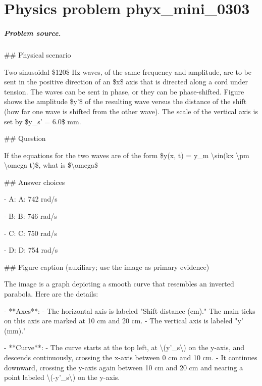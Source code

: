 
\chapter{Physics problem phyx\_mini\_0303}
\label{ch:PhyXMiniProblems_problem_phyx_mini_0303}

\paragraph{Problem source.}
\#\# Physical scenario

Two sinusoidal \$120\$ Hz waves, of the same frequency and amplitude, are to be sent in the positive direction of an \$x\$ axis that is directed along a cord under tension. The waves can be sent in phase, or they can be phase-shifted. Figure shows the amplitude \$y'\$ of the resulting wave versus the distance of the shift (how far one wave is shifted from the other wave). The scale of the vertical axis is set by \$y\_s' = 6.0\$ mm.

\#\# Question

If the equations for the two waves are of the form \$y(x, t) = y\_m \textbackslash{}sin(kx \textbackslash{}pm \textbackslash{}omega t)\$, what is \$\textbackslash{}omega\$

\#\# Answer choices

- A: A: 742 rad/s

- B: B: 746 rad/s

- C: C: 750 rad/s

- D: D: 754 rad/s

\#\# Figure caption (auxiliary; use the image as primary evidence)

The image is a graph depicting a smooth curve that resembles an inverted parabola. Here are the details:

- **Axes**:
  - The horizontal axis is labeled "Shift distance (cm)." The main ticks on this axis are marked at 10 cm and 20 cm.
  - The vertical axis is labeled "y' (mm)."

- **Curve**:
  - The curve starts at the top left, at \textbackslash{}(y'\_s\textbackslash{}) on the y-axis, and descends continuously, crossing the x-axis between 0 cm and 10 cm.
  - It continues downward, crossing the y-axis again between 10 cm and 20 cm and nearing a point labeled \textbackslash{}(-y'\_s\textbackslash{}) on the y-axis.

